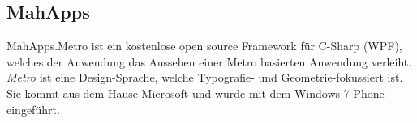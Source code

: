 \subsection{MahApps}
\label{mahapps}
MahApps.Metro ist ein kostenlose open source Framework für C-Sharp (WPF), welches der Anwendung das Aussehen einer Metro basierten Anwendung verleiht. \textit{Metro} ist eine Design-Sprache, welche Typografie- und Geometrie-fokussiert ist. Sie kommt aus dem Hause Microsoft und wurde mit dem Windows 7 Phone eingeführt.\cite{metro}